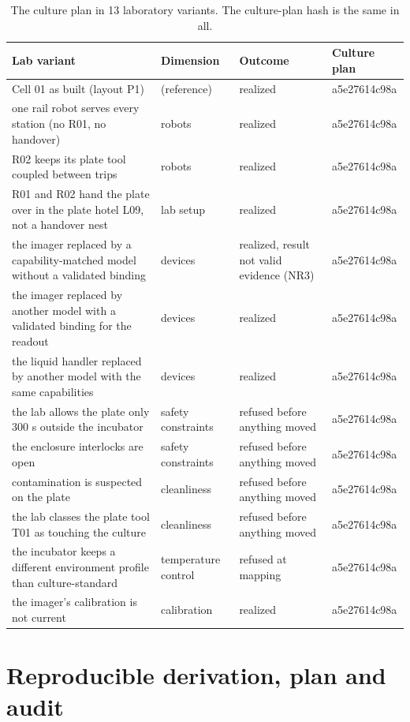 \documentclass[10pt,a4paper]{article}
\begin{document}
\begin{table}[tbp]\centering\footnotesize
\caption{The culture plan in 13 laboratory variants. The culture-plan hash is the same in all.}\label{tab:labs}
\begin{tabularx}{\linewidth}{Xlll}\toprule
\textbf{Lab variant} & \textbf{Dimension} & \textbf{Outcome} & \textbf{Culture plan} \\\midrule
Cell 01 as built (layout P1) & (reference) & realized & a5e27614c98a \\
one rail robot serves every station (no R01, no handover) & robots & realized & a5e27614c98a \\
R02 keeps its plate tool coupled between trips & robots & realized & a5e27614c98a \\
R01 and R02 hand the plate over in the plate hotel L09, not a handover nest & lab setup & realized & a5e27614c98a \\
the imager replaced by a capability-matched model without a validated binding & devices & realized, result not valid evidence (NR3) & a5e27614c98a \\
the imager replaced by another model with a validated binding for the readout & devices & realized & a5e27614c98a \\
the liquid handler replaced by another model with the same capabilities & devices & realized & a5e27614c98a \\
the lab allows the plate only 300 s outside the incubator & safety constraints & refused before anything moved & a5e27614c98a \\
the enclosure interlocks are open & safety constraints & refused before anything moved & a5e27614c98a \\
contamination is suspected on the plate & cleanliness & refused before anything moved & a5e27614c98a \\
the lab classes the plate tool T01 as touching the culture & cleanliness & refused before anything moved & a5e27614c98a \\
the incubator keeps a different environment profile than culture-standard & temperature control & refused at mapping & a5e27614c98a \\
the imager's calibration is not current & calibration & realized & a5e27614c98a \\\bottomrule
\end{tabularx}
\end{table}

\section{Reproducible derivation, plan and audit}\label{sec:repro}
\end{document}
